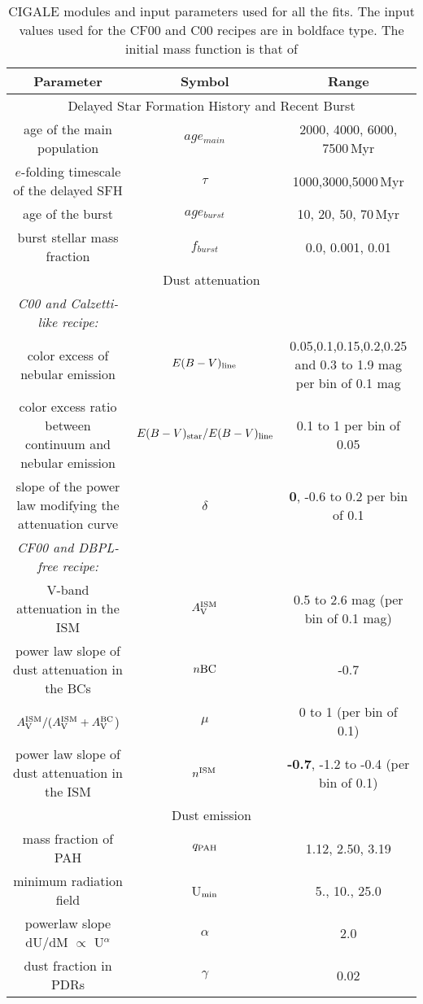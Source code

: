 \documentclass{aa}
\begin{document}
\begin{table*}
\scriptsize
\centering
\begin{tabular}{c c c}
\hline\hline
Parameter & Symbol & Range \\
\hline
\multicolumn{3}{c}{Delayed Star Formation History and  Recent Burst}\\
\hline
age  of the main population& $age_{main}$ & 2000,  4000, 6000, 7500\,Myr\\
$e$-folding timescale of the delayed  SFH & $\tau$ & 1000,3000,5000\,Myr\\
age of the burst &  $age_{burst}$ & 10, 20, 50, 70\,Myr\\
burst stellar mass fraction  & $f_{burst}$& 0.0, 0.001, 0.01\\
\hline
\multicolumn{3}{c}{Dust attenuation}\\
\hline
\textit{ C00 and Calzetti-like recipe:} & &\\
color excess of  nebular emission & $E(B-V)_{\rm line}$ & 0.05,0.1,0.15,0.2,0.25 and 0.3 to 1.9 mag per bin of 0.1 mag\\
color excess ratio between continuum and nebular emission& $E(B-V)_{\rm star}/E(B-V)_{\rm line}$ & 0.1 to 1  per bin of 0.05\\
slope of the power law modifying the attenuation curve & $\delta$  &{\bf 0}, -0.6 to 0.2 per bin of 0.1\\
\hline
\textit{CF00 and DBPL-free recipe:} & &\\
V-band attenuation in the ISM  & $A_{\rm V}^{\rm ISM}$ & 0.5 to 2.6 mag (per bin of 0.1 mag) \\
power law slope of dust attenuation in the BCs & $n{\rm BC}$ & -0.7\\
$A_{\rm V}^{\rm ISM}/ (A_{\rm V}^{\rm ISM}+A_{\rm V}^{\rm BC}$) & $ \mu$ & 0 to 1 (per bin of 0.1)\\
power law slope of dust attenuation in the ISM & $n^{\rm ISM}$ &  {\bf -0.7}, -1.2 to -0.4 (per bin of 0.1)\\
\hline
\multicolumn{3}{c}{Dust emission}\\
\hline
mass fraction of PAH & $q_{\rm PAH}$ & 1.12, 2.50, 3.19\\
minimum radiation field & U$_{\rm min}$ & 5., 10., 25.0\\
powerlaw slope dU/dM $\propto$ U$^{\alpha}$ & $\alpha$ & 2.0\\
dust fraction in PDRs & $\gamma$  & 0.02\\
\hline\hline
\end{tabular}
\caption{CIGALE modules and input parameters used for all the fits. The input values used for the CF00 and C00 recipes are in boldface type. The initial mass function is that of \citet{Salpeter55} }
\label{param}
\end{table*}
\end{document}
